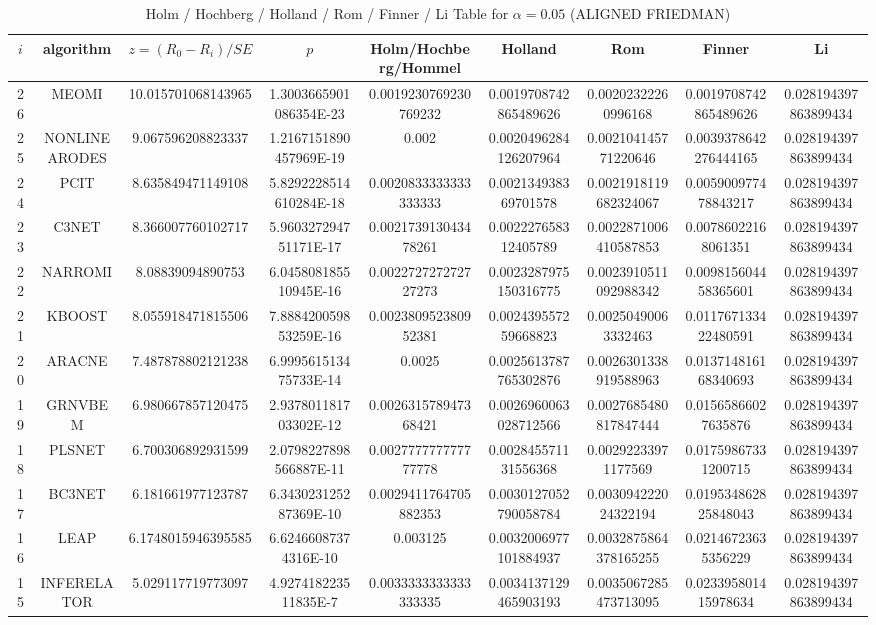 \documentclass[a4paper,10pt]{article}
\begin{document}
\begin{landscape}
\begin{table}[!htp]
\centering\scriptsize
\caption{Holm / Hochberg / Holland / Rom / Finner / Li Table for $\alpha=0.05$ (ALIGNED FRIEDMAN)}
\begin{tabular}{ccccccccc}
$i$&algorithm&$z=(R_0 - R_i)/SE$&$p$&Holm/Hochberg/Hommel&Holland&Rom&Finner&Li\\
\hline
26&MEOMI&10.015701068143965&1.3003665901086354E-23&0.0019230769230769232&0.0019708742865489626&0.00202322260996168&0.0019708742865489626&0.028194397863899434\\
25&NONLINEARODES&9.067596208823337&1.2167151890457969E-19&0.002&0.0020496284126207964&0.002104145771220646&0.0039378642276444165&0.028194397863899434\\
24&PCIT&8.635849471149108&5.8292228514610284E-18&0.0020833333333333333&0.002134938369701578&0.0021918119682324067&0.005900977478843217&0.028194397863899434\\
23&C3NET&8.366007760102717&5.960327294751171E-17&0.002173913043478261&0.002227658312405789&0.0022871006410587853&0.00786022168061351&0.028194397863899434\\
22&NARROMI&8.08839094890753&6.045808185510945E-16&0.002272727272727273&0.0023287975150316775&0.0023910511092988342&0.009815604458365601&0.028194397863899434\\
21&KBOOST&8.055918471815506&7.888420059853259E-16&0.002380952380952381&0.002439557259668823&0.00250490063332463&0.011767133422480591&0.028194397863899434\\
20&ARACNE&7.487878802121238&6.999561513475733E-14&0.0025&0.0025613787765302876&0.0026301338919588963&0.013714816168340693&0.028194397863899434\\
19&GRNVBEM&6.980667857120475&2.937801181703302E-12&0.002631578947368421&0.0026960063028712566&0.0027685480817847444&0.01565866027635876&0.028194397863899434\\
18&PLSNET&6.700306892931599&2.0798227898566887E-11&0.002777777777777778&0.002845571131556368&0.00292233971177569&0.01759867331200715&0.028194397863899434\\
17&BC3NET&6.181661977123787&6.343023125287369E-10&0.0029411764705882353&0.0030127052790058784&0.003094222024322194&0.019534862825848043&0.028194397863899434\\
16&LEAP&6.1748015946395585&6.62466087374316E-10&0.003125&0.0032006977101884937&0.0032875864378165255&0.02146723635356229&0.028194397863899434\\
15&INFERELATOR&5.029117719773097&4.927418223511835E-7&0.0033333333333333335&0.0034137129465903193&0.0035067285473713095&0.023395801415978634&0.028194397863899434\\

\end{tabular}
\end{table}
\end{landscape}
\end{document}
